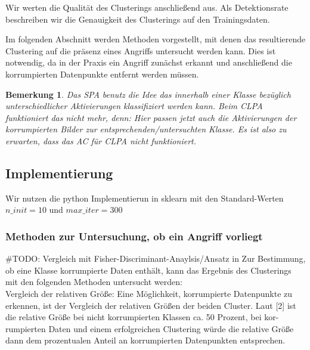 \documentclass[11pt,a4paper]{article}
\newtheorem{remark}[theorem]{Bemerkung}
\numberwithin{equation}{section}
\begin{document}
	Wir werten die Qualität des Clusterings anschließend aus. Als Detektionsrate
	beschreiben wir die Genauigkeit des Clusterings auf den Trainingsdaten.
	
	Im folgenden Abschnitt werden Methoden vorgestellt, mit denen das resultierende Clustering auf die präsenz eines Angriffs untersucht werden kann. Dies ist notwendig, da in der Praxis ein Angriff zunächst erkannt und anschließend die korrumpierten Datenpunkte entfernt werden müssen. 
	
	\begin{remark}
		Das SPA benutz die Idee das innerhalb einer Klasse bezüglich unterschiedlicher Aktivierungen klassifiziert werden kann. Beim CLPA funktioniert das nicht mehr, denn: Hier passen jetzt auch die Aktivierungen der korrumpierten Bilder zur entsprechenden/untersuchten Klasse. Es ist also zu erwarten, dass das AC für CLPA nicht funktioniert.
	\end{remark}
	
	\subsection{Implementierung}
	Wir nutzen die python Implementierun in sklearn mit den Standard-Werten $n\_init=10$ und $max\_iter=300$
	
	
	\subsubsection{Methoden zur Untersuchung, ob ein Angriff vorliegt}
	\#TODO: Vergleich mit Fisher-Discriminant-Anaylsis/Ansatz in \cite{imagenet_unhansed_v1}
	Zur
	Bestimmung, ob eine Klasse korrumpierte Daten enthält, kann das Ergebnis
	des Clusterings mit den folgenden Methoden untersucht werden:\\
	
	\noindent {}
	{Vergleich der relativen Größe:} Eine Möglichkeit, korrumpierte Datenpunkte
	zu erkennen, ist der Vergleich der relativen Größen der beiden Cluster. Laut [2]
	ist die relative Größe bei nicht korrumpierten Klassen ca. 50 Prozent, bei kor-
	rumpierten Daten und einem erfolgreichen Clustering würde die relative Größe
	dann dem prozentualen Anteil an korrumpierten Datenpunkten entsprechen.\\
	
\end{document}
